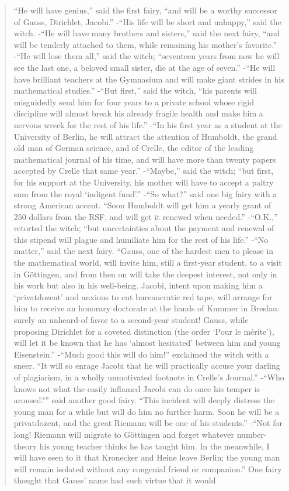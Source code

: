 \documentclass[b5paper]{article}
\begin{document}
\begin{mdframed}
\begin{quotation}
\enquote{He will have genius,} said the first fairy, \enquote{and will be a worthy successor of Gauss, Dirichlet, Jacobi.} -\enquote{His life will be short and unhappy,} said the witch. -\enquote{He will have many brothers and sisters,} said the next fairy, \enquote{and will be tenderly attached to them, while remaining his mother's favorite.} -\enquote{He will lose them all,} said the witch; \enquote{seventeen years from now he will see the last one, a beloved small sister, die at the age of seven.} -\enquote{He will have brilliant teachers at the Gymnasium and will make giant strides in his mathematical studies.} -\enquote{But first,} said the witch, \enquote{his parents will misguidedly send him for four years to a private school whose rigid discipline will almost break his already fragile health and make him a nervous wreck for the rest of his life.} -\enquote{In his first year as a student at the University of Berlin, he will attract the attention of Humboldt, the grand old man of German science, and of Crelle, the editor of the leading mathematical journal of his time, and will have more than twenty papers accepted by Crelle that same year.} -\enquote{Maybe,} said the witch; \enquote{but first, for his support at the University, his mother will have to accept a paltry sum from the royal \enquote{indigent fund}.} -\enquote{So what?} said one big fairy with a strong American accent. \enquote{Soon Humboldt will get him a yearly grant of 250 dollars from the RSF, and will get it renewed when needed.} -\enquote{O.K.,} retorted the witch; \enquote{but uncertainties about the payment and renewal of this stipend will plague and humiliate him for the rest of his life.} -\enquote{No matter,} said the next fairy. \enquote{Gauss, one of the hardest men to please in the mathematical world, will invite him, still a first-year student, to a visit in Göttingen, and from then on will take the deepest interest, not only in his work but also in his well-being. Jacobi, intent upon making him a \enquote{privatdozent} and anxious to cut bureaucratic red tape, will arrange for him to receive an honorary doctorate at the hands of Kummer in Breslau: surely an unheard-of favor to a second-year student! Gauss, while proposing Dirichlet for a coveted distinction (the order \enquote{Pour le mérite}), will let it be known that he has \enquote{almost hesitated} between him and young Eisenstein.} -\enquote{Much good this will do him!} exclaimed the witch with a sneer. \enquote{It will so enrage Jacobi that he will practically accuse your darling of plagiarism, in a wholly unmotivated footnote in Crelle's Journal.} -\enquote{Who knows not what the easily inflamed Jacobi can do once his temper is aroused?} said another good fairy. \enquote{This incident will deeply distress the young man for a while but will do him no further harm. Soon he will be a privatdozent, and the great Riemann will be one of his students.} -\enquote{Not for long! Riemann will migrate to Göttingen and forget whatever number-theory his young teacher thinks he has taught him. In the meanwhile, I will have seen to it that Kronecker and Heine leave Berlin; the young man will remain isolated without any congenial friend or companion.} One fairy thought that Gauss' name had such virtue that it would 
\end{quotation}
\end{mdframed}
\end{document}
